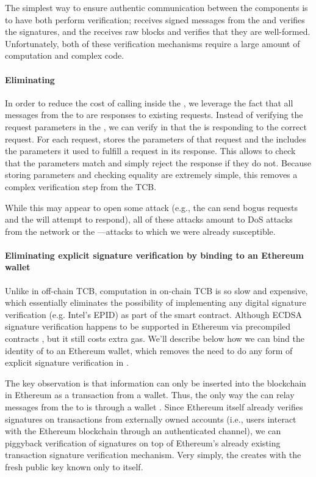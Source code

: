 The simplest way to ensure authentic communication between the components is to have both perform verification;
\tcont receives signed messages from the \encname and verifies the signatures,
and the \encname receives raw blocks and verifies that they are well-formed.
Unfortunately, both of these verification mechanisms require a large amount of computation and complex code.
\fi


\paragraph{Eliminating \oauth}

In order to reduce
the cost of calling \oauth inside the \tcboff, we leverage
the fact that all messages from the \tcboff to \tcbon  are responses to existing
requests.  Instead of verifying the request parameters in the \tcboff, we can
verify in \tcbon that the \tcboff is responding to the correct request.  For
each request, \tcbon stores the parameters of that request and the \tcboff
includes the parameters it used to fulfill a request in its response.  This
allows \tcbon to check that the parameters match and simply reject the response
if they do not.  Because storing parameters and checking equality are extremely
simple, this removes a complex verification step from the TCB.

While this may appear to open some attack (e.g., the \medname can send bogus
requests and the \tcboff will attempt to respond), all of these attacks amount
to DoS attacks from the network or the \medname---attacks to which we were
already susceptible.


\paragraph{Eliminating explicit signature verification
by binding \tcboff to an Ethereum wallet \tcadd}

Unlike in off-chain TCB, computation in on-chain TCB is so slow and expensive, which
essentially eliminates the possibility of implementing any digital signature
verification (e.g. Intel's EPID) as part of the smart contract.
Although ECDSA signature verification happens to be supported in Ethereum via
precompiled contracts , but it still costs extra gas.
We'll describe below how we can bind the identity of \tcboff 
to an Ethereum wallet, which removes
the need to do any form of explicit signature verification in \tcbon.

The key observation is that information can only be inserted into the blockchain
in Ethereum as a transaction from a wallet.  Thus, the only way the \medname can
relay messages from the \tcboff to \tcbon is through a wallet \tcadd.  
Since Ethereum itself already verifies
signatures on transactions from externally owned accounts (i.e., users interact
with the Ethereum blockchain through an authenticated channel), we can 
piggyback verification of \tcboff signatures on top of Ethereum's
already existing transaction signature verification mechanism.  Very simply,
the \tcboff creates \tcadd with the fresh public key \pk known only to 
\tcboff itself. 

